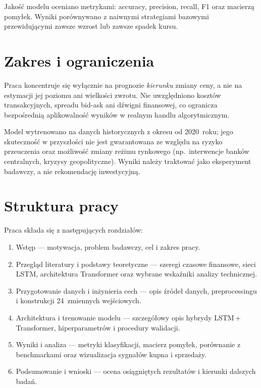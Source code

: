 Jakość modelu oceniano metrykami: accuracy, precision, recall, F1 oraz macierzą pomyłek.
Wyniki porównywano z naiwnymi strategiami bazowymi przewidującymi zawsze wzrost lub zawsze spadek kursu.

\section*{Zakres i ograniczenia}

Praca koncentruje się wyłącznie na prognozie \emph{kierunku} zmiany ceny, a nie na estymacji jej poziomu
ani wielkości zwrotu. Nie uwzględniono kosztów transakcyjnych, spreadu bid-ask ani dźwigni finansowej,
co ogranicza bezpośrednią aplikowalność wyników w realnym handlu algorytmicznym.

Model wytrenowano na danych historycznych z okresu od 2020~roku; jego skuteczność w przyszłości
nie jest gwarantowana ze względu na ryzyko przeuczenia oraz możliwość zmiany reżimu rynkowego
(np.\ interwencje banków centralnych, kryzysy geopolityczne). Wyniki należy traktować jako eksperyment badawczy,
a nie rekomendację inwestycyjną.

\section*{Struktura pracy}


Praca składa się z następujących rozdziałów:
\begin{enumerate}
    \item Wstęp --- motywacja, problem badawczy, cel i zakres pracy.
    \item Przegląd literatury i podstawy teoretyczne --- szeregi czasowe finansowe,
          sieci LSTM, architektura Transformer oraz wybrane wskaźniki analizy technicznej.
    \item Przygotowanie danych i inżynieria cech --- opis źródeł danych, preprocessingu
          i konstrukcji 24~zmiennych wejściowych.
    \item Architektura i trenowanie modelu --- szczegółowy opis hybrydy LSTM\,+\,Transformer,
          hiperparametrów i procedury walidacji.
    \item Wyniki i analiza --- metryki klasyfikacji, macierz pomyłek, porównanie z benchmarkami
          oraz wizualizacja sygnałów kupna i sprzedaży.
    \item Podsumowanie i wnioski --- ocena osiągniętych rezultatów i kierunki dalszych badań.
\end{enumerate}
